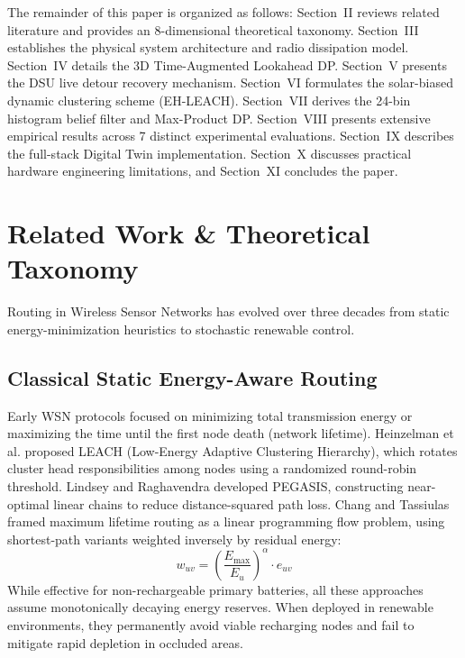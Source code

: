 \documentclass[journal]{IEEEtran}
\begin{document}
The remainder of this paper is organized as follows: Section~II reviews related literature and provides an 8-dimensional theoretical taxonomy. Section~III establishes the physical system architecture and radio dissipation model. Section~IV details the 3D Time-Augmented Lookahead DP. Section~V presents the DSU live detour recovery mechanism. Section~VI formulates the solar-biased dynamic clustering scheme (EH-LEACH). Section~VII derives the 24-bin histogram belief filter and Max-Product DP. Section~VIII presents extensive empirical results across 7 distinct experimental evaluations. Section~IX describes the full-stack Digital Twin implementation. Section~X discusses practical hardware engineering limitations, and Section~XI concludes the paper.

\section{Related Work \& Theoretical Taxonomy}
Routing in Wireless Sensor Networks has evolved over three decades from static energy-minimization heuristics to stochastic renewable control.

\subsection{Classical Static Energy-Aware Routing}
Early WSN protocols focused on minimizing total transmission energy or maximizing the time until the first node death (network lifetime). Heinzelman et al. \cite{heinzelman2000energy} proposed LEACH (Low-Energy Adaptive Clustering Hierarchy), which rotates cluster head responsibilities among nodes using a randomized round-robin threshold. Lindsey and Raghavendra \cite{lindsey2002pegasis} developed PEGASIS, constructing near-optimal linear chains to reduce distance-squared path loss. Chang and Tassiulas \cite{chang2004maximum} framed maximum lifetime routing as a linear programming flow problem, using shortest-path variants weighted inversely by residual energy:
\begin{equation}
w_{uv} = \left( \frac{E_{\max}}{E_u} \right)^\alpha \cdot e_{uv}
\end{equation}
While effective for non-rechargeable primary batteries, all these approaches assume monotonically decaying energy reserves. When deployed in renewable environments, they permanently avoid viable recharging nodes and fail to mitigate rapid depletion in occluded areas.
\end{document}
